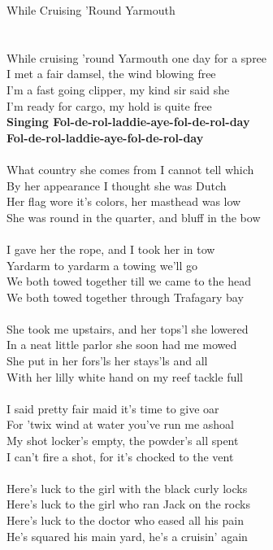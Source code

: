 \documentclass[letterpaper,9pt]{article}
\begin{document}
\newpage
{}
\huge
While Cruising 'Round Yarmouth\\
\\
\Large
\noindent
\\While cruising 'round Yarmouth one day for a spree
\\I met a fair damsel, the wind blowing free
\\I'm a fast going clipper, my kind sir said she
\\I'm ready for cargo, my hold is quite free
\\\textbf{Singing Fol-de-rol-laddie-aye-fol-de-rol-day
\\Fol-de-rol-laddie-aye-fol-de-rol-day}
\\
\\What country she comes from I cannot tell which
\\By her appearance I thought she was Dutch
\\Her flag wore it's colors, her masthead was low
\\She was round in the quarter, and bluff in the bow
\\
\\I gave her the rope, and I took her in tow
\\Yardarm to yardarm a towing we'll go
\\We both towed together till we came to the head
\\We both towed together through Trafagary bay
\\
\\She took me upstairs, and her tops'l she lowered
\\In a neat little parlor she soon had me mowed
\\She put in her fors'ls her stays'ls and all
\\With her lilly white hand on my reef tackle full
\\
\\I said pretty fair maid it's time to give oar
\\For 'twix wind at water you've run me ashoal
\\My shot locker's empty, the powder's all spent
\\I can't fire a shot, for it's chocked to the vent
\\
\\Here's luck to the girl with the black curly locks
\\Here's luck to the girl who ran Jack on the rocks
\\Here's luck to the doctor who eased all his pain
\\He's squared his main yard, he's a cruisin' again
\end{document}
